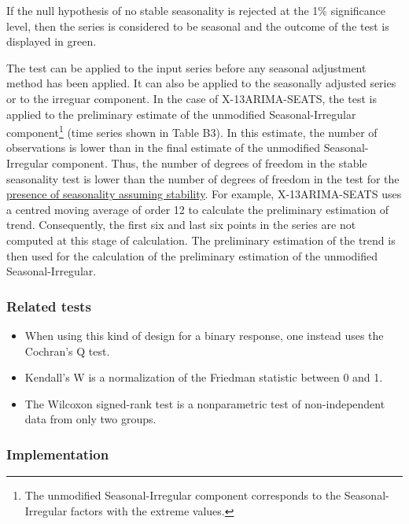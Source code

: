 \documentclass[
  letterpaper,
  DIV=11,
  numbers=noendperiod]{scrreprt}
\providecommand{\tightlist}{%
  \setlength{\itemsep}{0pt}\setlength{\parskip}{0pt}}\usepackage{longtable,booktabs,array}
\begin{document}
If the null hypothesis of no stable seasonality is rejected at the 1\%
significance level, then the series is considered to be seasonal and the
outcome of the test is displayed in green.

The test can be applied to the input series before any seasonal
adjustment method has been applied. It can also be applied to the
seasonally adjusted series or to the irreguar component. In the case of
X-13ARIMA-SEATS, the test is applied to the preliminary estimate of the
unmodified Seasonal-Irregular component\footnote{The unmodified
  Seasonal-Irregular component corresponds to the Seasonal-Irregular
  factors with the extreme values.} (time series shown in Table B3). In
this estimate, the number of observations is lower than in the final
estimate of the unmodified Seasonal-Irregular component. Thus, the
number of degrees of freedom in the stable seasonality test is lower
than the number of degrees of freedom in the test for the
\href{../theory/Tests_presence_stability.html}{presence of seasonality
assuming stability}. For example, X-13ARIMA-SEATS uses a centred moving
average of order 12 to calculate the preliminary estimation of trend.
Consequently, the first six and last six points in the series are not
computed at this stage of calculation. The preliminary estimation of the
trend is then used for the calculation of the preliminary estimation of
the unmodified Seasonal-Irregular.

\hypertarget{related-tests}{%
\subsubsection{Related tests}\label{related-tests}}

\begin{itemize}
\tightlist
\item
  When using this kind of design for a binary response, one instead uses
  the Cochran's Q test.
\item
  Kendall's W is a normalization of the Friedman statistic between 0 and
  1.
\item
  The Wilcoxon signed-rank test is a nonparametric test of
  non-independent data from only two groups.
\end{itemize}

\hypertarget{implementation-2}{%
\subsubsection{Implementation}\label{implementation-2}}
\end{document}
